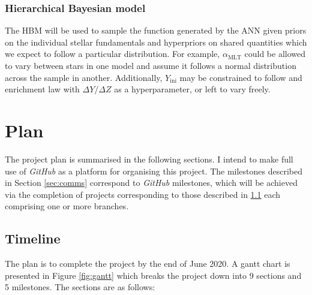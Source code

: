 \documentclass[twocolumn]{aastex63}
\newcommand{\Yini}{Y_{\mathrm{ini}}}
\newcommand{\mlt}{\alpha_{\mathrm{MLT}}}
\begin{document}
\subsubsection{Hierarchical Bayesian model}

The HBM will be used to sample the function generated by the ANN given priors on the individual stellar fundamentals and hyperpriors on shared quantities which we expect to follow a particular distribution. For example, $\mlt$ could be allowed to vary between stars in one model and assume it follows a normal distribution across the sample in another. Additionally, $\Yini$ may be constrained to follow and enrichment law with $\Delta Y/\Delta Z$ as a hyperparameter, or left to vary freely.

\section{Plan}

The project plan is summarised in the following sections. I intend to make full use of \textit{GitHub} as a platform for organising this project. The milestones described in Section \ref{sec:comms} correspond to \textit{GitHub} milestones, which will be achieved via the completion of projects corresponding to those described in \ref{sec:timeline} each comprising one or more branches. 

\subsection{Timeline}\label{sec:timeline}

The plan is to complete the project by the end of June 2020. A gantt chart is presented in Figure \ref{fig:gantt} which breaks the project down into 9 sections and 5 milestones. The sections are as follows:
\end{document}
